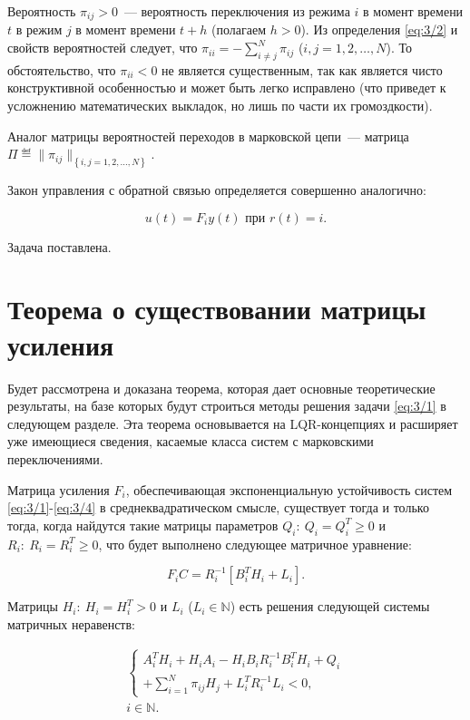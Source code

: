 Вероятность $\pi_{ij}>0$~--- вероятность переключения из режима $i$ в момент времени $t$ в режим $j$ в момент времени $t+h$ (полагаем $h>0$). Из определения \vref{eq:3/2} и свойств вероятностей следует, что $\pi_{ii} = -\sum_{i\not=j}^N\pi_{ij}$ ($i,j=1,2,\ldots,N$). То обстоятельство, что $\pi_{ii}<0$ не является существенным, так как является чисто конструктивной особенностью и может быть легко исправлено\cite{CDC} (что приведет к усложнению математических выкладок, но лишь по части их громоздкости).

Аналог матрицы вероятностей переходов в марковской цепи~--- матрица $\Pi \eqdef \|\pi_{ij}\|_{\left\{i,j=1,2,\ldots,N\right\}}$.\br

Закон управления с обратной связью определяется совершенно аналогично:

\begin{equation}
\label{eq:3/4}
u(t)=F_iy(t) \mbox{~при } r(t)=i\mbox{.}
\end{equation}

Задача поставлена.






\section{Теорема о существовании матрицы усиления}

Будет рассмотрена и доказана теорема, которая дает основные теоретические результаты, на базе которых будут строиться методы решения задачи \vref{eq:3/1} в следующем разделе. Эта теорема основывается на LQR-концепциях и расширяет уже имеющиеся сведения\cite{GLXKA}, касаемые класса систем с марковскими переключениями.

\begin{teo}
\label{teo:3/1}
Матрица усиления $F_i$, обеспечивающая экспоненциальную устойчивость систем \ref{eq:3/1}-\ref{eq:3/4} в среднеквадратическом смысле, существует тогда и только тогда, когда найдутся такие матрицы параметров $Q_i\colon~Q_i = Q_i^T \geqslant 0$ и $R_i\colon~R_i = R_i^T \geqslant 0$, что будет выполнено следующее матричное уравнение:

\begin{equation}
\label{eq:3/5}
F_iC = R_i^{-1}[B_i^TH_i + L_i]\mbox{.}
\end{equation}

Матрицы $H_i\colon~H_i = H_i^T > 0$ и $L_i$ ($L_i \in \mathbb{N}$) есть решения следующей системы матричных неравенств:

\begin{eqnarray}
\label{eq:3/6}
\left\{ \begin{array}{l}
A_i^TH_i + H_iA_i - H_iB_iR_i^{-1}B_i^TH_i + Q_i \\
+ \sum\limits_{i=1}^N\pi_{ij}H_j + L_i^TR_i^{-1}L_i < 0\mbox{,}
\end{array} \right. \\
i \in \mathbb{N}\mbox{.} \nonumber
\end{eqnarray}

\end{teo}

